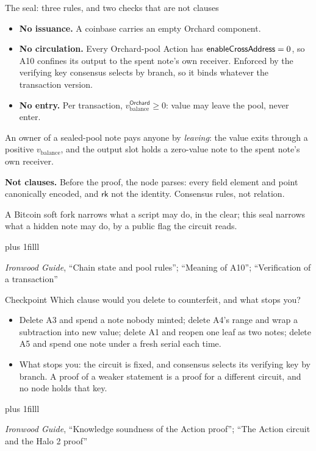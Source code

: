 \documentclass[aspectratio=169,11pt]{beamer}
\newcommand{\rksym}{\ensuremath{\mathsf{rk}}}
\newcommand{\src}[1]{\par\vskip0pt plus 1filll
  {\fontsize{6}{7.2}\selectfont\color{arbdim}\raggedright #1\par}}
\begin{document}
\begin{frame}{The seal: three rules, and two checks that are not clauses}
\begin{itemize}
  \item \textbf{No issuance.} A coinbase carries an empty Orchard
    component.
  \item \textbf{No circulation.} Every Orchard-pool Action has
    $\mathsf{enableCrossAddress} = 0$, so A10 confines its output to the
    spent note's own receiver. Enforced by the verifying key consensus
    selects by branch, so it binds whatever the transaction version.
  \item \textbf{No entry.} Per transaction,
    $v_{\mathrm{balance}}^{\mathsf{Orchard}} \ge 0$: value may leave the
    pool, never enter.
\end{itemize}
An owner of a sealed-pool note pays anyone by \emph{leaving}: the value
exits through a positive $v_{\mathrm{balance}}$, and the output slot
holds a zero-value note to the spent note's own receiver.
\medskip

\textbf{Not clauses.} Before the proof, the node parses: every field
element and point canonically encoded, and $\rksym$ not the identity.
Consensus rules, not relation.
\medskip

\small A Bitcoin soft fork narrows what a script may do, in the clear;
this seal narrows what a hidden note may do, by a public flag the circuit
reads.
\src{\emph{Ironwood Guide}, ``Chain state and pool rules''; ``Meaning of A10'';
  ``Verification of a transaction''}
\end{frame}

\begin{frame}{Checkpoint}
{\Large Which clause would you delete to counterfeit, and what stops
you?}
\pause
\medskip
\begin{itemize}
  \item Delete A3 and spend a note nobody minted; delete A4's range and
    wrap a subtraction into new value; delete A1 and reopen one leaf as
    two notes; delete A5 and spend one note under a fresh serial each
    time.
  \item What stops you: the circuit is fixed, and consensus selects its
    verifying key by branch. A proof of a weaker statement is a proof
    for a different circuit, and no node holds that key.
\end{itemize}
\src{\emph{Ironwood Guide}, ``Knowledge soundness of the Action proof''; ``The
  Action circuit and the Halo 2 proof''}
\end{frame}
\end{document}

